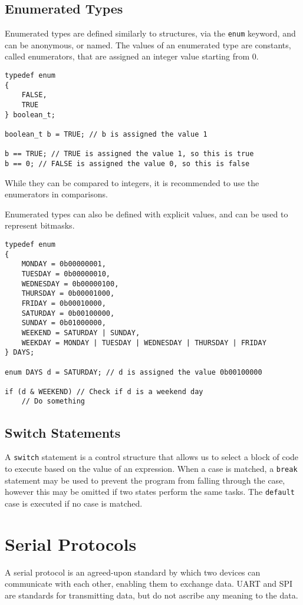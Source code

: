 \documentclass[a4paper]{report}
\begin{document}
\section{Enumerated Types}
Enumerated types are defined similarly to structures, via the
\texttt{enum} keyword, and can be anonymous, or named. The
values of an enumerated type are constants, called enumerators, that
are assigned an integer value starting from 0.
\begin{verbatim}
typedef enum
{
    FALSE,
    TRUE
} boolean_t;

boolean_t b = TRUE; // b is assigned the value 1

b == TRUE; // TRUE is assigned the value 1, so this is true
b == 0; // FALSE is assigned the value 0, so this is false
\end{verbatim}
While they can be compared to integers, it is recommended to use the
enumerators in comparisons.

Enumerated types can also be defined with explicit values, and can be
used to represent bitmasks.
\begin{verbatim}
typedef enum
{
    MONDAY = 0b00000001,
    TUESDAY = 0b00000010,
    WEDNESDAY = 0b00000100,
    THURSDAY = 0b00001000,
    FRIDAY = 0b00010000,
    SATURDAY = 0b00100000,
    SUNDAY = 0b01000000,
    WEEKEND = SATURDAY | SUNDAY,
    WEEKDAY = MONDAY | TUESDAY | WEDNESDAY | THURSDAY | FRIDAY
} DAYS;

enum DAYS d = SATURDAY; // d is assigned the value 0b00100000

if (d & WEEKEND) // Check if d is a weekend day
    // Do something
\end{verbatim}
\section{Switch Statements}
A \texttt{switch} statement is a control structure that allows
us to select a block of code to execute based on the value of an
expression. When a case is matched, a \texttt{break} statement
may be used to prevent the program from falling through the case,
however this may be omitted if two states perform the same tasks. The
\texttt{default} case is executed if no case is matched.
\chapter{Serial Protocols}
A serial protocol is an agreed-upon standard by which two devices can
communicate with each other, enabling them to exchange data. UART and
SPI are standards for transmitting data, but do not ascribe any meaning
to the data.
\end{document}
